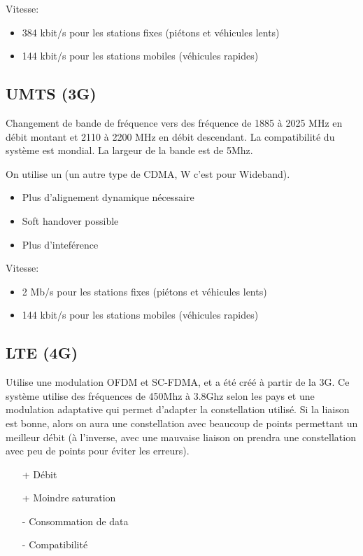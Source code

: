 Vitesse:
\begin{itemize}
\item 384 kbit/s pour les stations fixes (piétons et véhicules lents)
\item 144 kbit/s pour les stations mobiles (véhicules rapides)
\end{itemize}

\subsection{UMTS (3G)}

Changement de bande de fréquence vers des fréquence de 1885 à 2025 MHz en débit montant et 2110 à 2200 MHz en débit descendant. La compatibilité du système est mondial. La largeur de la bande est de 5Mhz.

On utilise un  (un autre type de CDMA, W c'est pour Wideband).
\begin{itemize}
  \item {Plus d'alignement dynamique nécessaire}
  \item {Soft handover possible}
  \item {Plus d'inteférence}
\end{itemize}


Vitesse:
\begin{itemize}
\item 2 Mb/s pour les stations fixes (piétons et véhicules lents)
\item 144 kbit/s pour les stations mobiles (véhicules rapides)
\end{itemize}

\subsection{LTE (4G)}

Utilise une modulation OFDM et SC-FDMA, et a été créé à partir de la 3G. Ce système utilise des fréquences de 450Mhz à 3.8Ghz selon les pays et une modulation adaptative qui permet d'adapter la constellation utilisé. Si la liaison est bonne, alors on aura une constellation avec beaucoup de points permettant un meilleur débit (à l'inverse, avec une mauvaise liaison on prendra une constellation avec peu de points pour éviter les erreurs).

\begin{itemize}
	\item[+] Débit
	\item[+] Moindre saturation
	\item[-] Consommation de data
	\item[-] Compatibilité
\end{itemize}

